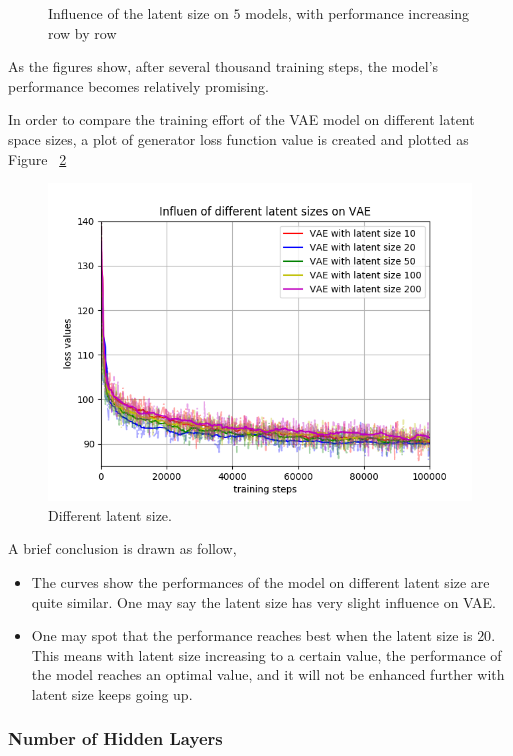 \documentclass[12pt,letterpaper]{article}
\begin{document}
\begin{figure}[h]
    \hspace*{\fill}
    \caption{Influence of the latent size on $5$ models, with performance increasing row by row} 
    \label{fig:MNIST_VAE_latent}
\end{figure}

As the figures show, after several thousand training steps, the model's performance becomes relatively promising.

In order to compare the training effort of the VAE model on different latent space sizes, a plot of generator loss function value is created and plotted as Figure ~\ref{fig:vae_latent}

\begin{figure}[h]
    \centering
    \includegraphics[width=.6\linewidth]{VAE_MNIST_latents.png}
    \caption{\small Different latent size.}
    \label{fig:vae_latent}
\end{figure}

A brief conclusion is drawn as follow,
\begin{itemize}
    \item The curves show the performances of the model on different latent size are quite similar. One may say the latent size has very slight influence on VAE. 
    \item One may spot that the performance reaches best when the latent size is $20$. This means with latent size increasing to a certain value, the performance of the model reaches an optimal value, and it will not be enhanced further with latent size keeps going up.
\end{itemize}

\subsubsection{Number of Hidden Layers}
\end{document}
